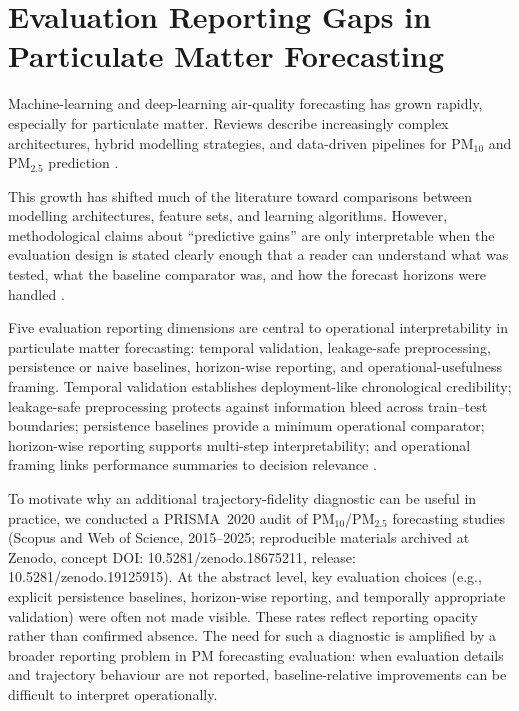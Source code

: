 \documentclass[3p,times,single-column]{elsarticle}
\begin{document}
\section{Evaluation Reporting Gaps in Particulate Matter Forecasting}

Machine-learning and deep-learning air-quality forecasting has grown rapidly, especially for particulate matter. Reviews describe increasingly complex architectures, hybrid modelling strategies, and data-driven pipelines for PM$_{10}$ and PM$_{2.5}$ prediction \cite{mendez2023,tang2024,chadalavada2025}.

This growth has shifted much of the literature toward comparisons between modelling architectures, feature sets, and learning algorithms. However, methodological claims about ``predictive gains'' are only interpretable when the evaluation design is stated clearly enough that a reader can understand what was tested, what the baseline comparator was, and how the forecast horizons were handled \cite{makridakis2018,cerqueira2020}.

Five evaluation reporting dimensions are central to operational interpretability in particulate matter forecasting: temporal validation, leakage-safe preprocessing, persistence or naive baselines, horizon-wise reporting, and operational-usefulness framing. Temporal validation establishes deployment-like chronological credibility; leakage-safe preprocessing protects against information bleed across train--test boundaries; persistence baselines provide a minimum operational comparator; horizon-wise reporting supports multi-step interpretability; and operational framing links performance summaries to decision relevance \cite{tashman2000,kaufman2012,jolliffe2012}.

To motivate why an additional trajectory-fidelity diagnostic can be useful in practice, we conducted a PRISMA~2020 audit of PM$_{10}$/PM$_{2.5}$ forecasting studies (Scopus and Web of Science, 2015--2025; reproducible materials archived at Zenodo, concept DOI: 10.5281/zenodo.18675211, release: 10.5281/zenodo.19125915). At the abstract level, key evaluation choices (e.g., explicit persistence baselines, horizon-wise reporting, and temporally appropriate validation) were often not made visible. These rates reflect reporting opacity rather than confirmed absence. The need for such a diagnostic is amplified by a broader reporting problem in PM forecasting evaluation: when evaluation details and trajectory behaviour are not reported, baseline-relative improvements can be difficult to interpret operationally.
\end{document}
